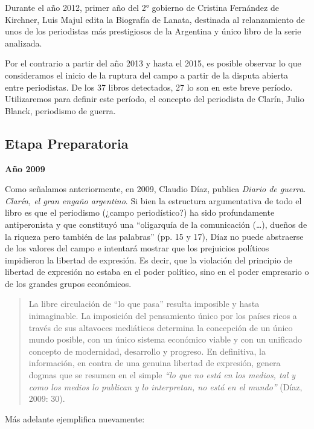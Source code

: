Durante el año 2012, primer año del 2° gobierno de Cristina Fernández de Kirchner, Luis Majul edita la Biografía de Lanata, destinada al relanzamiento de unos de los periodistas más prestigiosos de la Argentina y único libro de la serie analizada.

Por el contrario a partir del año 2013 y hasta el 2015, es posible observar lo que consideramos el inicio de la ruptura del campo a partir de la disputa abierta entre periodistas. De los 37 libros detectados, 27 lo son en este breve período. Utilizaremos para definir este período, el concepto del periodista de Clarín, Julio Blanck, periodismo de guerra.


\subsection{Etapa Preparatoria}

\textbf{Año 2009}

Como señalamos anteriormente, en 2009, Claudio Díaz, publica \emph{Diario de guerra}. \emph{Clarín, el gran engaño argentino}. Si bien la estructura argumentativa de todo el libro es que el periodismo (¿campo periodístico?) ha sido profundamente antiperonista y que constituyó una ``oligarquía de la comunicación (\ldots), dueños de la riqueza pero también de las palabras'' (pp. 15 y 17), Díaz no puede abstraerse de los valores del campo e intentará mostrar que los prejuicios políticos impidieron la libertad de expresión. Es decir, que la violación del principio de libertad de expresión no estaba en el poder político, sino en el poder empresario o de los grandes grupos económicos.

\begin{quote}
La libre circulación de ``lo que pasa'' resulta imposible y hasta inimaginable. La imposición del pensamiento único por los países ricos a través de sus altavoces mediáticos determina la concepción de un único mundo posible, con un único sistema económico viable y con un unificado concepto de modernidad, desarrollo y progreso. En definitiva, la información, en contra de una genuina libertad de expresión, genera dogmas que se resumen en el simple \emph{``lo que no está en los medios, tal y como los medios lo publican y lo interpretan, no está en el mundo''} (Díaz, 2009: 30).
\end{quote}

Más adelante ejemplifica nuevamente:

